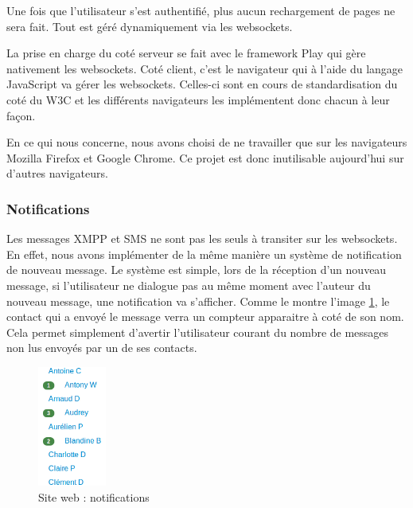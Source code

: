 Une fois que l'utilisateur s'est authentifié, plus aucun rechargement de pages ne sera fait.
Tout est géré dynamiquement via les websockets. 

La prise en charge du coté serveur se fait avec le framework Play qui gère nativement les websockets.
Coté client, c'est le navigateur qui à l'aide du langage JavaScript va gérer les websockets.
Celles-ci sont en cours de standardisation du coté du W3C et les différents navigateurs les implémentent donc chacun à leur façon.

En ce qui nous concerne, nous avons choisi de ne travailler que sur les navigateurs Mozilla Firefox et Google Chrome.
Ce projet est donc inutilisable aujourd'hui sur d'autres navigateurs.


\subsubsection{Notifications}

Les messages XMPP et SMS ne sont pas les seuls à transiter sur les websockets.
En effet, nous avons implémenter de la même manière un système de notification de nouveau message.
Le système est simple, lors de la réception d'un nouveau message, si l'utilisateur ne dialogue pas au même moment avec l'auteur du nouveau message, une notification va s'afficher.
Comme le montre l'image \ref{siteWeb_notifications}, le contact qui a envoyé le message verra un compteur apparaitre à coté de son nom.
Cela permet simplement d'avertir l'utilisateur courant du nombre de messages non lus envoyés par un de ses contacts.

\begin{figure}[!h]
	\center
	\includegraphics[width=0.2\textwidth]{img/siteWeb_notifications.png}
	\caption{Site web : notifications}
	\label{siteWeb_notifications}
\end{figure}



